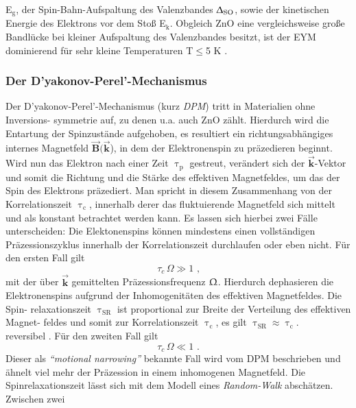 E$_\text{g}$, der Spin-Bahn-Aufspaltung des Valenzbandes $\Updelta_\text{SO}$,
sowie der kinetischen Energie des Elektrons vor dem Stoß E$_\text{k}$. Obgleich
ZnO eine vergleichsweise große Bandlücke bei kleiner Aufspaltung des
Valenzbandes besitzt, ist der EYM dominierend für sehr kleine Temperaturen
T$\leq$5 K \cite{Buyanova.2010,Whittaker.1996}. \subsubsection{Der
D'yakonov-Perel'-Mechanismus} \label{DPM} Der D'yakonov-Perel'-Mechanismus (kurz
\textit{DPM}) \cite{Dyakonov.1971} tritt in Materialien ohne Inversions-
symmetrie auf, zu denen u.a. auch ZnO zählt. Hierdurch wird die Entartung der
Spinzustände aufgehoben, es resultiert ein richtungsabhängiges internes
Magnetfeld $\vec{\textbf{B}}(\vec{\textbf{k}}$), in dem der Elektronenspin zu
präzedieren beginnt. Wird nun das Elektron nach einer Zeit $\uptau_\text{p}$
gestreut, verändert sich der $\vec{\textbf{k}}$-Vektor und somit die Richtung
und die Stärke des effektiven Magnetfeldes, um das der Spin des Elektrons
präzediert\cite{Zutic.2004}. Man spricht in diesem Zusammenhang von der
Korrelationszeit $\uptau_\text{c}$, innerhalb derer das fluktuierende Magnetfeld
sich mittelt und als konstant betrachtet werden kann. Es lassen sich hierbei
zwei Fälle unterscheiden: Die Elektonenspins können mindestens einen
vollständigen Präzessionszyklus innerhalb der Korrelationszeit durchlaufen oder
eben nicht. Für den ersten Fall gilt \begin{equation} \tau_c \,\Omega \gg 1
\text{ ,} \end{equation} mit der über $\vec{\textbf{k}}$ gemittelten
Präzessionsfrequenz $\Upomega$. Hierdurch dephasieren die Elektronenspins
aufgrund der Inhomogenitäten des effektiven Magnetfeldes. Die Spin-
relaxationszeit $\uptau_\text{SR}$ ist proportional zur Breite der Verteilung
des effektiven Magnet- feldes und somit zur Korrelationszeit $\uptau_\text{c}$,
es gilt $\uptau_\text{SR} \approx \uptau_\text{c}$.\\ %
reversibel \cite{Hu.2002}. Für den zweiten Fall gilt \begin{equation} \tau_c
\,\Omega \ll 1 \text{ .} \end{equation} Dieser als \textit{``motional
narrowing''} bekannte Fall wird vom DPM beschrieben und \mbox{ähnelt} viel mehr
der Präzession in einem inhomogenen Magnetfeld. Die Spinrelaxationszeit lässt
sich mit dem Modell eines \textit{Random-Walk} abschätzen. Zwischen zwei
